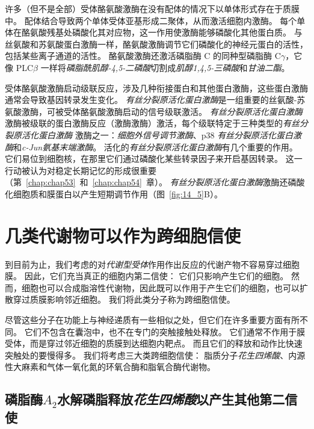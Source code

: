 许多（但不是全部）受体酪氨酸激酶在没有配体的情况下以单体形式存在于质膜中。
配体结合导致两个单体受体亚基形成二聚体，从而激活细胞内激酶。
每个单体在酪氨酸残基处磷酸化其对应物，这一作用使激酶能够磷酸化其他蛋白质。
与丝氨酸和苏氨酸蛋白激酶一样，酪氨酸激酶调节它们磷酸化的神经元蛋白的活性，包括某些离子通道的活性。
酪氨酸激酶还激活磷脂酶 C 的同种型磷脂酶 C$\gamma$，它像 PLC$\beta$ 一样将\textit{磷脂酰肌醇-4,5-二磷酸}切割成\textit{肌醇1,4,5-三磷酸}和\textit{甘油二酯}。


受体酪氨酸激酶启动级联反应，涉及几种衔接蛋白和其他蛋白激酶，这些蛋白激酶通常会导致基因转录发生变化。
\textit{有丝分裂原活化蛋白激酶}是一组重要的丝氨酸-苏氨酸激酶，可被受体酪氨酸激酶启动的信号级联激活。
\textit{有丝分裂原活化蛋白激酶}激酶被级联的蛋白激酶反应（激酶激酶）激活，每个级联特定于三种类型的\textit{有丝分裂原活化蛋白激酶} 激酶之一：\textit{细胞外信号调节激酶}、p38 \textit{有丝分裂原活化蛋白激酶}和\textit{c-Jun氨基末端激酶}。
活化的\textit{有丝分裂原活化蛋白激酶}有几个重要的作用。
它们易位到细胞核，在那里它们通过磷酸化某些转录因子来开启基因转录。
这一行动被认为对稳定长期记忆的形成很重要（第~\ref{chap:chap53}~和~\ref{chap:chap54}~章）。
\textit{有丝分裂原活化蛋白激酶}激酶还磷酸化细胞质和膜蛋白以产生短期调节作用（图~\ref{fig:14_5}B）。



\section{几类代谢物可以作为跨细胞信使}

到目前为止，我们考虑的对\textit{代谢型受体}作用作出反应的代谢产物不容易穿过细胞膜。
因此，它们充当真正的细胞内第二信使：
它们只影响产生它们的细胞。
然而，细胞也可以合成脂溶性代谢物，因此既可以作用于产生它们的细胞，也可以扩散穿过质膜影响邻近细胞。
我们将此类分子称为跨细胞信使。


尽管这些分子在功能上与神经递质有一些相似之处，但它们在许多重要方面有所不同。
它们不包含在囊泡中，也不在专门的突触接触处释放。
它们通常不作用于膜受体，而是穿过邻近细胞的质膜到达细胞内靶点。
而且它们的释放和动作比快速突触处的要慢得多。
我们将考虑三大类跨细胞信使：
脂质分子\textit{花生四烯酸}、内源性大麻素和气体一氧化氮的环氧合酶和脂氧合酶代谢物。



\subsection{磷脂酶$A_2$水解磷脂释放\textit{花生四烯酸}以产生其他第二信使}

